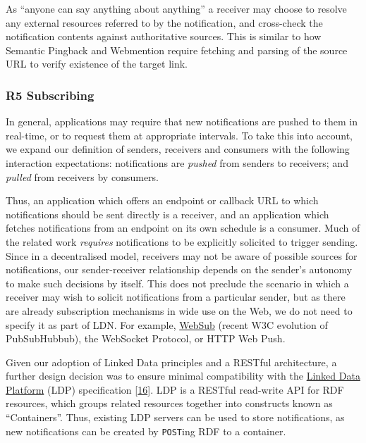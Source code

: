 \documentclass[]{article}
\begin{document}
As ``anyone can say anything about anything'' a receiver may choose to
resolve any external resources referred to by the notification, and
cross-check the notification contents against authoritative sources.
This is similar to how Semantic Pingback and Webmention require fetching
and parsing of the source URL to verify existence of the target link.

\hypertarget{subscribing}{}
\subsubsection{R5 Subscribing}\label{r5-subscribing}

In general, applications may require that new notifications are pushed
to them in real-time, or to request them at appropriate intervals. To
take this into account, we expand our definition of senders, receivers
and consumers with the following interaction expectations: notifications
are \emph{pushed} from senders to receivers; and \emph{pulled} from
receivers by consumers.

Thus, an application which offers an endpoint or callback URL to which
notifications should be sent directly is a receiver, and an application
which fetches notifications from an endpoint on its own schedule is a
consumer. Much of the related work \emph{requires} notifications to be
explicitly solicited to trigger sending. Since in a decentralised model,
receivers may not be aware of possible sources for notifications, our
sender-receiver relationship depends on the sender's autonomy to make
such decisions by itself. This does not preclude the scenario in which a
receiver may wish to solicit notifications from a particular sender, but
as there are already subscription mechanisms in wide use on the Web, we
do not need to specify it as part of LDN. For example,
\href{https://www.w3.org/TR/websub/}{WebSub} (recent W3C evolution of
PubSubHubbub), the WebSocket Protocol, or HTTP Web Push.

Given our adoption of Linked Data principles and a RESTful architecture,
a further design decision was to ensure minimal compatibility with the
\href{https://www.w3.org/TR/ldp/}{Linked Data Platform} (LDP)
specification {[}\protect\hyperlink{ref-16}{16}{]}. LDP is a RESTful
read-write API for RDF resources, which groups related resources
together into constructs known as ``Containers''. Thus, existing LDP
servers can be used to store notifications, as new notifications can be
created by \texttt{POST}ing RDF to a container.
\end{document}
